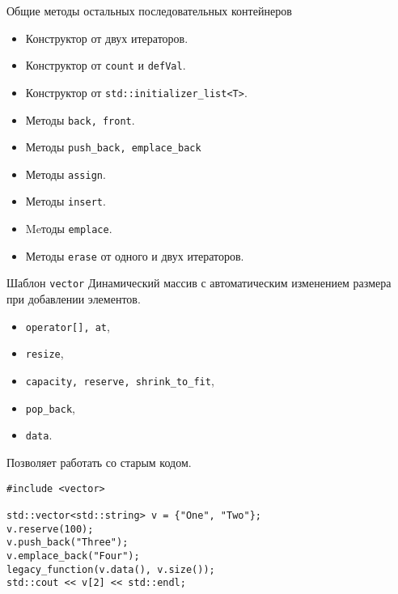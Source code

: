 \documentclass[aspectration=1610,t]{beamer}
\begin{document}
\begin{frame}{Общие методы остальных последовательных контейнеров}
\begin{itemize}
    \item Конструктор от двух итераторов.  
    \item Конструктор от \texttt{count} и \texttt{defVal}.
    \item Конструктор от \texttt{std::initializer\_list<T>}.
    \item Методы {\tt back, front}.
    \item Методы \texttt{push\_back, emplace\_back}    
    \item Методы {\tt assign}.
    \item Методы {\tt insert}. 
    \item Meтоды \texttt{emplace}.
    \item Методы \texttt{erase} от одного и двух итераторов. 
\end{itemize}
\end{frame}

\begin{frame}[fragile]{Шаблон {\tt vector}}
    Динамический массив с автоматическим изменением размера\\ при
    добавлении элементов.

\begin{itemize}
    \item \texttt{operator[], at},
    \item \texttt{resize},
    \item \texttt{capacity, reserve, shrink\_to\_fit},
    \item \texttt{pop\_back},
    \item \texttt{data}.
\end{itemize}

Позволяет работать со старым кодом.
\begin{lstlisting}
#include <vector>

std::vector<std::string> v = {"One", "Two"};
v.reserve(100);
v.push_back("Three");
v.emplace_back("Four");
legacy_function(v.data(), v.size());
std::cout << v[2] << std::endl;
\end{lstlisting}
\end{frame}
           
\end{document}
